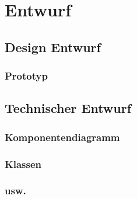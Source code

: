 \chapter{Entwurf}
	\section{Design Entwurf}	
		\subsection{Prototyp}
	\section{Technischer Entwurf} 	
		\subsection{Komponentendiagramm}
		\subsection{Klassen}
		\subsection{usw.}
		
